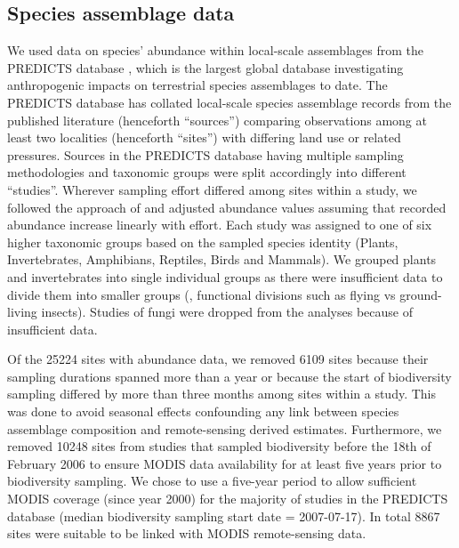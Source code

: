 \subsection{Species assemblage data}
\label{C02_0202}
We used data on species’ abundance within local-scale assemblages from the PREDICTS database \citep[downloaded on 3 February 2016, see \ref{SI02_01}]{Hudson2016}, which is the largest global database investigating anthropogenic impacts on terrestrial species assemblages to date. The PREDICTS database has collated local-scale species assemblage records from the published literature (henceforth “sources”) comparing observations among at least two localities (henceforth “sites”) with differing land use or related pressures. Sources in the PREDICTS database having multiple sampling methodologies and taxonomic groups were split accordingly into different “studies”. Wherever sampling effort differed among sites within a study, we followed the approach of \cite{Newbold2014b} and adjusted abundance values assuming that recorded abundance increase linearly with effort. Each study was assigned to one of six higher taxonomic groups based on the sampled species identity (Plants, Invertebrates, Amphibians, Reptiles, Birds and Mammals). We grouped plants and invertebrates into single individual groups as there were insufficient data to divide them into smaller groups (\eg, functional divisions such as flying vs ground-living insects). Studies of fungi were dropped from the analyses because of insufficient data.

Of the 25224 sites with abundance data, we removed 6109 sites because their sampling durations spanned more than a year or because the start of biodiversity sampling differed by more than three months among sites within a study. This was done to avoid seasonal effects confounding any link between species assemblage composition and remote-sensing derived estimates. Furthermore, we removed 10248 sites from studies that sampled biodiversity before the 18th of February 2006 to ensure MODIS data availability for at least five years prior to biodiversity sampling. We chose to use a five-year period to allow sufficient MODIS coverage (since year 2000) for the majority of studies in the PREDICTS database (median biodiversity sampling start date = 2007-07-17). In total 8867 sites were suitable to be linked with MODIS remote-sensing data.

